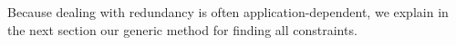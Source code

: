 \documentclass{IEEEtran}
\newcommand{\range}[3]{\ensuremath{#1[#2,#3]}}
\newcommand{\rangeall}{:}
\newcommand{\eccalc}[2]{\ensuremath{#1 = #2}}
\newcommand{\ecfkey}[2]{\ensuremath{\textit{FOREIGNKEY}(#1,#2)}}
\newcommand{\ecalldiff}[1]{\ensuremath{\textit{ALLDIFFERENT}(#1)}}
\newcommand{\eclookupf}[4]{\ensuremath{\textit{LOOKUP}_{\textit{#4}}(#1, #2, #3)}}
\newcommand{\eclookup}[4]{\eccalc{#1}{\eclookupf{#2}{#3}{#4}{}}}
\newcommand{\ecperm}[1]{\ensuremath{\textit{PERMUTATION}(#1)}}
\newcommand{\ecdiff}[3]{\eccalc{#1}{#2 - #3}}
\theoremstyle{definition}
\begin{document}
Because dealing with redundancy is often application-dependent, we explain in the next section our generic method for finding all constraints.


%
%
%
%
%
%
\end{document}
